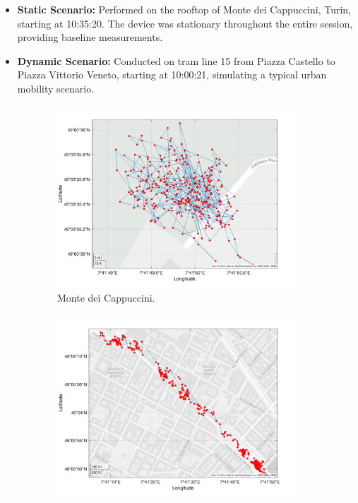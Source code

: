     \begin{itemize}
        \item \textbf{Static Scenario:} Performed on the rooftop of Monte dei Cappuccini, Turin, starting at 10:35:20. The device was stationary throughout the entire session, providing baseline measurements.
        \item \textbf{Dynamic Scenario:} Conducted on tram line 15 from Piazza Castello to Piazza Vittorio Veneto, starting at 10:00:21, simulating a typical urban mobility scenario.
    \end{itemize}
    \begin{figure}[h!]
      \centering
      \begin{subfigure}{0.23\textwidth}
          \centering
          \includegraphics[width=\textwidth]{images/Monte_Cappuccini/filtered/Samsung_A51_Monte_Cappuccini_fig6.png}
          \caption{Monte dei Cappuccini.}
          \label{fig:static_scenario}
      \end{subfigure}
      \hfill
      \begin{subfigure}{0.23\textwidth}
          \centering
          \includegraphics[width=\textwidth]{images/Tram_15_trip_Castello_to_Pescatore/filtered/Samsung_A51_Tram_15_trip_Castello_to_Pescatore_fig6.png}

\end{subfigure}
\end{figure}
